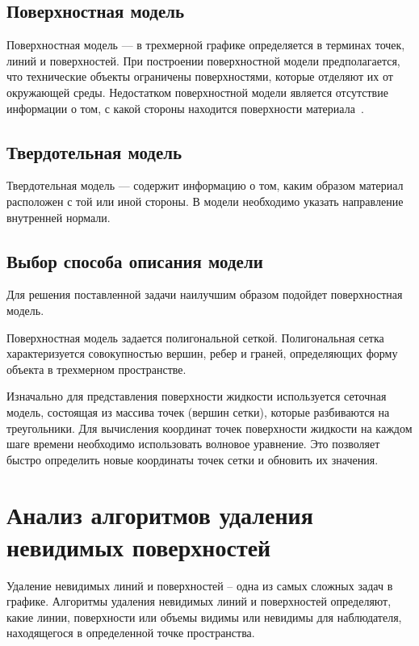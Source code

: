 \subsection{Поверхностная модель}
Поверхностная модель --- в трехмерной графике определяется в терминах точек, линий и поверхностей. 
При построении поверхностной модели предполагается, что технические объекты ограничены поверхностями, которые отделяют их от окружающей среды. 
Недостатком поверхностной модели является отсутствие информации о том, с какой стороны находится поверхности материала~\cite{MTM}.

\subsection{Твердотельная модель}
Твердотельная модель --- содержит информацию о том, каким образом материал расположен с той или иной стороны. 
В модели необходимо указать направление внутренней нормали.

\subsection{Выбор способа описания модели}

Для решения поставленной задачи наилучшим образом подойдет поверхностная модель.

Поверхностная модель задается полигональной сеткой. 
Полигональная сетка характеризуется совокупностью вершин, ребер и граней, определяющих форму объекта в трехмерном пространстве.

Изначально для представления поверхности жидкости используется сеточная модель, состоящая из массива точек (вершин сетки), которые разбиваются на треугольники. 
Для вычисления координат точек поверхности жидкости на каждом шаге времени необходимо использовать волновое уравнение. 
Это позволяет быстро определить новые координаты точек сетки и обновить их значения.

\newpage 

\section{Анализ алгоритмов удаления невидимых поверхностей}

Удаление невидимых линий и поверхностей -- одна из самых сложных задач в графике. 
Алгоритмы удаления невидимых линий и поверхностей определяют, какие линии, поверхности или объемы видимы или невидимы для наблюдателя, находящегося в определенной точке пространства.

